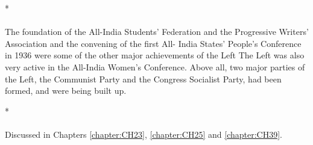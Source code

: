 \begin{center}*\end{center}

\paragraph*{}
The foundation of the All-India Students' Federation and the Progressive Writers' Association and the convening of the first All- India States' People's Conference in 1936 were some of the other major achievements of the Left The Left was also very active in the All-India Women's Conference. Above all, two major parties of the Left, the Communist Party and the Congress Socialist Party, had been formed, and were being built up.

\begin{center}*\end{center}

\paragraph*{}
Discussed in Chapters \ref{chapter:CH23}, \ref{chapter:CH25} and \ref{chapter:CH39}.